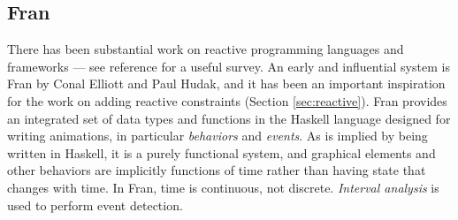 \documentclass[reprint]{sigplanconf}
\begin{document}

\subsection{Fran}
\label{sec:fran}

There has been substantial work on reactive programming languages and
frameworks --- see reference
\cite{bainomugisha-computing-surveys-2012} for a useful survey.  An
early and influential system is Fran by Conal Elliott and Paul Hudak,
and it has been an important inspiration for the work on adding
reactive constraints (Section \ref{sec:reactive}).  Fran provides an
integrated set of data types and functions in the Haskell language
designed for writing animations, in particular \emph{behaviors} and
\emph{events}.  As is implied by being written in Haskell, it is a
purely functional system, and graphical elements and other behaviors
are implicitly functions of time rather than having state that changes
with time.  In Fran, time is continuous, not discrete.  \emph{Interval
  analysis} \cite{snyder-siggraph-1992} is used to perform event
detection.
\end{document}
